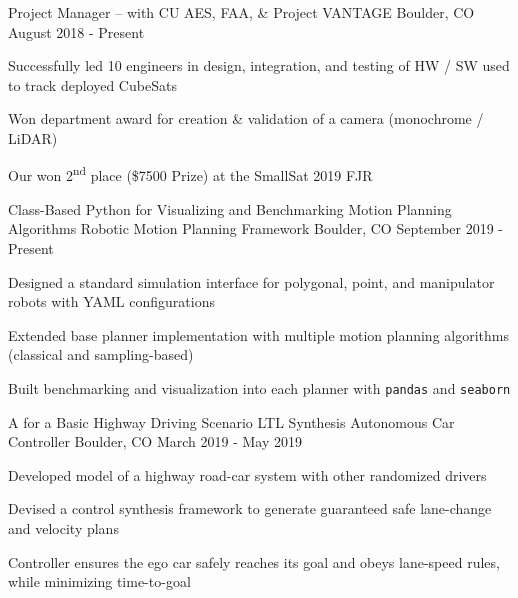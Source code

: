 \begin{cventries}
\cventry
    {Project Manager --  with CU AES, FAA, \& }
    {Project VANTAGE}
    {Boulder, CO}
    {August 2018 - Present}
    {
     \begin{cvitems}
      \item{Successfully led 10 engineers in design, integration, and testing of HW / SW used to track deployed CubeSats}
      \item{Won department award for creation \& validation of a camera (monochrome / LiDAR) }
      \item{Our
       won 2\textsuperscript{nd} place (\$7500 Prize) at the SmallSat 2019 FJR }
     \end{cvitems}
    }
    
  \cventry
  	{Class-Based Python   for Visualizing and Benchmarking Motion Planning Algorithms }
    {Robotic Motion Planning Framework}
    {Boulder, CO}
    {September 2019 - Present}
    {
      \begin{cvitems}
        \item{Designed a standard simulation interface for polygonal, point, and manipulator robots with YAML configurations}
        \item{Extended base planner implementation with multiple motion planning algorithms (classical and sampling-based)}
        \item {Built benchmarking and visualization into each planner with \texttt{pandas} and \texttt{seaborn}}
      \end{cvitems}
    }

  \cventry
  	{A  for a Basic Highway Driving Scenario}
    {LTL Synthesis Autonomous Car Controller}
    {Boulder, CO}
    {March 2019 - May 2019}
    {
      \begin{cvitems}
        \item{Developed model of a highway road-car system with other randomized drivers}
        \item{Devised a control synthesis framework to generate guaranteed safe lane-change and velocity plans}
        \item {Controller ensures the ego car safely reaches its goal and obeys lane-speed rules, while minimizing time-to-goal}
      \end{cvitems}
    }
\end{cventries}
